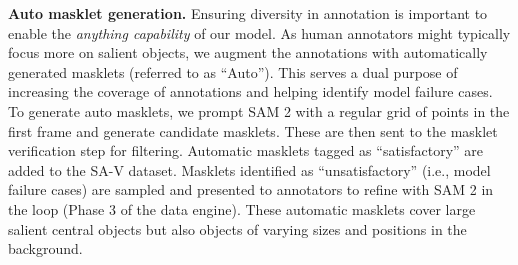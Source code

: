 \documentclass[]{fairmeta}
\renewcommand{\paragraph}[1]{\vspace{1.25mm}\noindent\textbf{#1}}
\renewcommand{\paragraph}[1]{\vspace{1.25mm}\noindent\textbf{#1}}
\begin{document}
\paragraph{Auto masklet generation.} Ensuring diversity in annotation is important to enable the \textit{anything capability} of our model. As human annotators might typically focus more on salient objects, we augment the annotations with automatically generated masklets (referred to as ``Auto''). This serves a dual purpose of increasing the coverage of annotations and helping identify model failure cases. To generate auto masklets, we prompt SAM 2 with a regular grid of points in the first frame and generate candidate masklets. These are then sent to the masklet verification step for filtering. Automatic masklets tagged as ``satisfactory'' are added to the SA-V dataset. Masklets identified as ``unsatisfactory'' (i.e., model failure cases) are sampled and presented to annotators to refine with SAM 2 in the loop (Phase 3 of the data engine). These automatic masklets cover large salient central objects but also objects of varying sizes and positions in the background.

\begin{table}[t]
\vspace{-10pt}
\vspace{-5pt}
    \caption{Evolution of data engine phases showing the average annotation time per frame, the average percent of edited frames per masklet, the number of manual clicks per clicked frame, and Mask Alignment to Phase 1 by mask size.}  
    \label{tab:data-engine-evolution}
\end{table}
\end{document}
